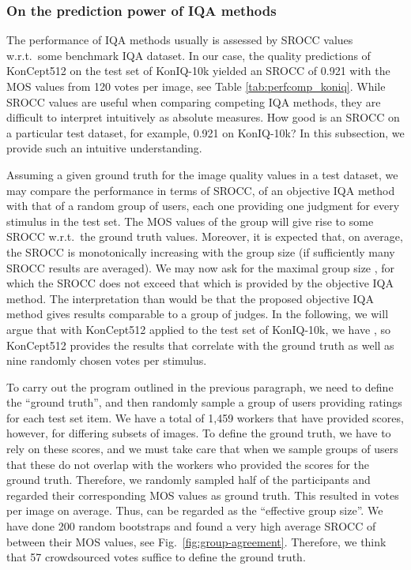 \documentclass[10pt,journal,compsoc]{IEEEtran}
\begin{document}
\subsubsection{On the prediction power of IQA methods}

The performance of IQA methods usually is assessed by SROCC values w.r.t.\ some benchmark IQA dataset. In our case, the quality predictions of KonCept512 on the test set of KonIQ-10k yielded an SROCC of 0.921 with the MOS values from 120 votes per image, see Table \ref{tab:perfcomp_koniq}. While SROCC values are useful when comparing competing IQA methods, they are difficult to interpret intuitively as absolute measures. How good is an SROCC on a particular test dataset, for example, 0.921 on KonIQ-10k? In this subsection, we provide such an intuitive understanding. 

Assuming a given ground truth for the image quality values in a test dataset, we may compare the performance in terms of SROCC, of an objective IQA method with that of a random group of  users, each one providing one judgment for every stimulus in the test set. The MOS values of the group will give rise to some SROCC w.r.t.\ the ground truth values. Moreover, it is expected that, on average, the SROCC is monotonically increasing with the group size  (if sufficiently many SROCC results are averaged). We may now ask for the maximal group size , for which the SROCC does not exceed that which is provided by the objective IQA method. The interpretation than would be that the proposed objective IQA method gives results comparable to a group of  judges. In the following, we will argue that with KonCept512 applied to the test set of KonIQ-10k, we have , so KonCept512 provides the results that correlate with the ground truth as well as nine randomly chosen votes per stimulus.


To carry out the program outlined in the previous paragraph, we need to define the ``ground truth'', and then randomly sample a group of users providing  ratings for each test set item. We have a total of 1,459 workers that have provided scores, however, for differing subsets of images. To define the ground truth, we have to rely on these scores, and we must take care that when we sample groups of users that these do not overlap with the workers who provided the scores for the ground truth. Therefore, we randomly sampled half of the participants and regarded their corresponding MOS values as ground truth. This resulted in  votes per image on average. Thus,  can be regarded as the ``effective group size''. We have done 200 random bootstraps and found a very high average SROCC of  between their MOS values, see Fig.\ \ref{fig:group-agreement}. Therefore, we think that 57 crowdsourced votes suffice to define the ground truth. 
\end{document}
